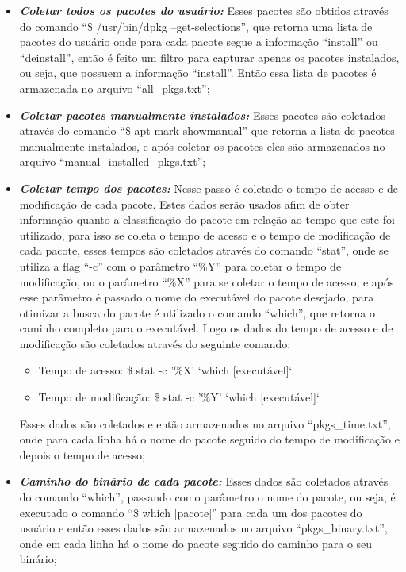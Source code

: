 \begin{anexosenv}
\begin{itemize}
  \item \textit{\textbf{Coletar todos os pacotes do usuário:}} Esses pacotes são
  obtidos através do comando ``\$ /usr/bin/dpkg --get-selections'', que retorna
  uma lista de pacotes do usuário onde para cada pacote segue a informação
  ``install'' ou ``deinstall'', então é feito um filtro para capturar apenas os
  pacotes instalados, ou seja, que possuem a informação ``install''. Então essa
  lista de pacotes é armazenada no arquivo ``all\_pkgs.txt'';

  \item \textit{\textbf{Coletar pacotes manualmente instalados:}} Esses pacotes são
  coletados através do comando ``\$ apt-mark showmanual'' que retorna a lista de
  pacotes manualmente instalados, e após coletar os pacotes eles são armazenados
  no arquivo ``manual\_installed\_pkgs.txt'';

  \item \textit{\textbf{Coletar tempo dos pacotes:}} Nesse passo é coletado o
  tempo de acesso e de modificação de cada pacote. Estes dados serão usados afim
  de obter informação quanto a classificação do pacote em relação ao tempo que
  este foi utilizado, para isso se coleta o tempo de acesso e o tempo de modificação
  de cada pacote, esses tempos são coletados através do comando ``stat'', onde se
  utiliza a flag ``-c'' com o parâmetro ``\%Y'' para coletar o tempo de modificação,
  ou o parâmetro ``\%X'' para se coletar o tempo de acesso, e após esse parâmetro é
  passado o nome do executável do pacote desejado, para otimizar a busca do pacote é
  utilizado o comando ``which'', que retorna o caminho completo para o executável.
  Logo os dados do tempo de acesso e de modificação são coletados através do seguinte
  comando:
  \begin{itemize}
      \item Tempo de acesso: \$ stat -c '\%X' `which [executável]`
      \item Tempo de modificação: \$ stat -c '\%Y' `which [executável]`
  \end{itemize}
  Esses dados são coletados e então armazenados no arquivo ``pkgs\_time.txt'',
  onde para cada linha há o nome do pacote seguido do tempo de modificação e
  depois o tempo de acesso;

  \item \textit{\textbf{Caminho do binário de cada pacote:}} Esses dados são
  coletados através do comando ``which'', passando como parâmetro o nome do
  pacote, ou seja, é executado o comando ``\$ which [pacote]'' para cada um
  dos pacotes do usuário e então esses dados são armazenados no arquivo
  ``pkgs\_binary.txt'', onde em cada linha há o nome do pacote seguido do
  caminho para o seu binário;


\end{itemize}
\end{anexosenv}
